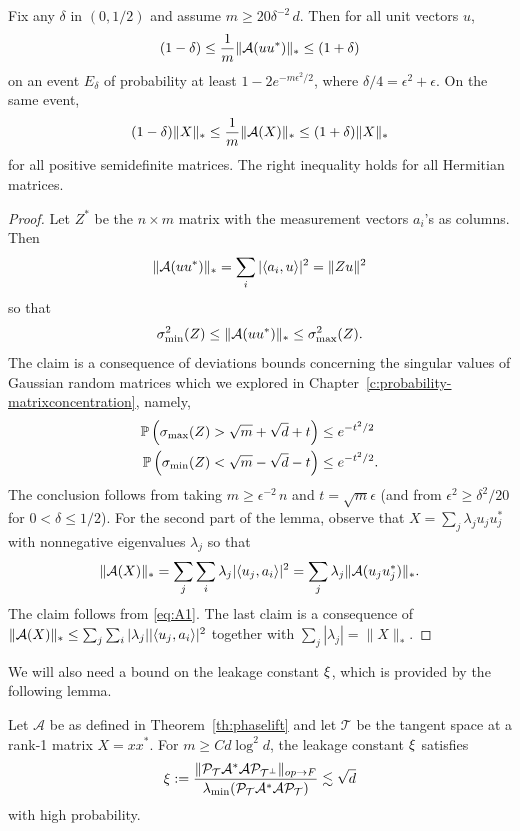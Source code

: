 \begin{lemma}\label{le:A1}
Fix any $\delta$ in $(0,1/2)$ and assume $m \ge 20 \delta^{-2} \,
  d$. Then for all unit vectors $u$,
\begin{equation}
\label{eq:A1}
(1-\delta) \le \frac{1}{m} \|\cA(uu^*)\|_* \le (1+\delta)
\end{equation}
on an event $E_\delta$ of probability at least $1-2e^{-m
  \epsilon^2/2}$, where $\delta/4 = \epsilon^2 + \epsilon$. On the
same event,
$$
(1-\delta) \|X\|_* \le \frac{1}{m} \|\cA(X)\|_* \le (1+\delta) \|X\|_*
$$
for all positive semidefinite matrices. The right inequality holds for
all Hermitian matrices.
\end{lemma}
\begin{proof}  Let $Z^*$ be the $n \times
  m$ matrix with the measurement vectors $a_i$'s as columns. Then
$$
\|\cA(uu^*)\|_* = \sum_i |\langle a_i, u\rangle|^2 = \|Z u\|^2
$$
so that 
$$
\sigma^2_{\text{min}}(Z) \le \|\cA(uu^*)\|_* \le
\sigma^2_{\text{max}}(Z). 
$$
The claim is a consequence of deviations bounds concerning
the singular values of Gaussian random matrices which we explored in Chapter~\ref{c:probability-matrixconcentration},
namely,
\begin{align*}
\P\left(\sigma_{\text{max}} (Z) > \sqrt{m} + \sqrt{d} + t\right)  & \le e^{- t^2/2}\\
\P\left(\sigma_{\text{min}}(Z) < \sqrt{m} - \sqrt{d} - t\right)  & \le e^{- t^2/2}.
\end{align*}
The conclusion follows from taking $m \ge \epsilon^{-2} \, n$ and $t =
\sqrt{m} \epsilon$ (and from $\epsilon^2 \geq \delta^2/20$ for $0 <
\delta \le 1/2$). For the second part of the lemma, observe that $X
= \sum_j \lambda_j u_j u_j^*$ with nonnegative eigenvalues
$\lambda_j$ so that
\[
\|\cA(X)\|_* = \sum_j \sum_i \lambda_j |\langle u_j,a_i\rangle|^2 = \sum_j
\lambda_j \|\cA(u_j u_j^*)\|_*.
\]
The claim follows from \eqref{eq:A1}. The last claim is a consequence
of $\|\cA(X)\|_* \le \sum_j \sum_i |\lambda_j| |\langle u_j,a_i\rangle|^2$
together with $\sum_j |\lambda_j| = \|X\|_*$. 
\end{proof}



We will also need a bound on the leakage constant $\Cleak$, which is provided by the following lemma.
\begin{lemma}\label{le:phaseleakage}
Let $\mathcal{A}$ be as defined in Theorem~\ref{th:phaselift} and let $\mathcal{T}$ be the tangent space at a rank-1 matrix $X=xx^*$. For $m \ge C d \log^2 d$, the leakage constant $\Cleak$ satisfies
$$\Cleak := \frac{\|\mathcal{P}_{\mathcal{T}} \mathcal{A}^* \mathcal{A} \mathcal{P}_{\mathcal{T}^\perp} \|_{op \to F}}{\lambda_{\min}(\mathcal{P}_{\mathcal{T}} \mathcal{A}^* \mathcal{A} \mathcal{P}_{\mathcal{T}})} \lesssim \sqrt{d}$$
with high probability.
\end{lemma}


